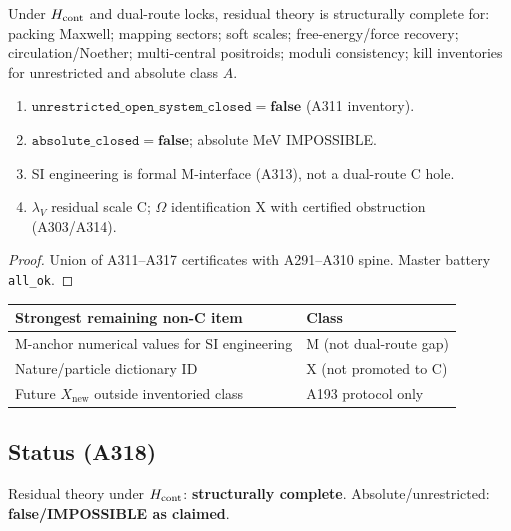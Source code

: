 \begin{theorem}
\label{thm:A318}
Under $H_{\rm cont}$ and dual-route locks, residual theory is structurally complete for:
packing Maxwell; mapping sectors; soft scales; free-energy/force recovery; circulation/Noether;
multi-central positroids; moduli consistency; kill inventories for unrestricted and absolute class $A$.
\begin{enumerate}[label=(\roman*)]
\item $\texttt{unrestricted\_open\_system\_closed}=\mathbf{false}$ (A311 inventory).
\item $\texttt{absolute\_closed}=\mathbf{false}$; absolute MeV IMPOSSIBLE.
\item SI engineering is formal M-interface (A313), not a dual-route C hole.
\item $\lambda_V$ residual scale C; $\Omega$ identification X with certified obstruction (A303/A314).
\end{enumerate}
\end{theorem}

\begin{proof}
Union of A311--A317 certificates with A291--A310 spine. Master battery \texttt{all\_ok}.
\end{proof}

\begin{center}
\begin{tabular}{@{}p{5.5cm}p{6.5cm}@{}}
\toprule
Strongest remaining non-C item & Class \\
\midrule
M-anchor numerical values for SI engineering & M (not dual-route gap) \\
Nature/particle dictionary ID & X (not promoted to C) \\
Future $X_{\mathrm{new}}$ outside inventoried class & A193 protocol only \\
\bottomrule
\end{tabular}
\end{center}

\subsection*{Status (A318)}
Residual theory under $H_{\rm cont}$: \textbf{structurally complete}. Absolute/unrestricted: \textbf{false/IMPOSSIBLE as claimed}.

